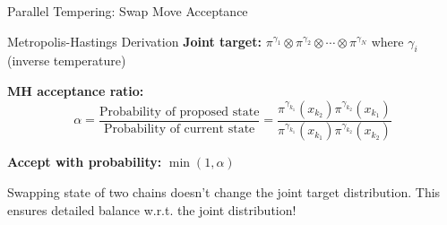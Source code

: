 \begin{frame}{Parallel Tempering: Swap Move Acceptance}
	\begin{block}{Metropolis-Hastings Derivation}
		\textbf{Joint target:} $\pi^{\gamma_1} \otimes \pi^{\gamma_2} \otimes \cdots \otimes \pi^{\gamma_N}$ where $\gamma_i$ (inverse temperature)

		\textbf{MH acceptance ratio:}
		$$\alpha = \frac{\text{Probability of proposed state}}{\text{Probability of current state}} = \frac{\pi^{\gamma_{k_1}}(x_{k_2})\pi^{\gamma_{k_2}}(x_{k_1})}{\pi^{\gamma_{k_1}}(x_{k_1})\pi^{\gamma_{k_2}}(x_{k_2})}$$

		\textbf{Accept with probability:} $\min(1, \alpha)$

		Swapping state of two chains doesn’t change the joint target distribution.
		This ensures detailed balance w.r.t. the joint distribution!
	\end{block}



\end{frame}


